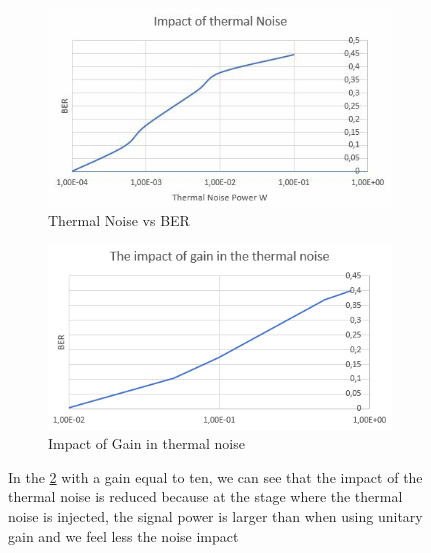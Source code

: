 \begin{figure}[H]
    \centering
	\begin{subfigure}{0.4\textwidth}
		\centering
    	\includegraphics[scale=0.45]{./lib/m_qam_receiver/figures/thermal_noise_ber.png}
    	\caption{Thermal Noise vs BER}
    	\label{fig:thermal}
	\end{subfigure}    
	\begin{subfigure}{0.4\textwidth}
    	\centering
    	\includegraphics[scale=0.45]{../lib/m_qam_receiver/figures/ber_thermal_gain.png}
    	\caption{Impact of Gain in thermal noise}
    	\label{fig:gainvsthermal}
	\end{subfigure}
\caption{In the \ref{fig:gainvsthermal} with a gain equal to ten, we can see that the impact of the thermal noise is reduced because at the stage where the thermal noise is injected, the signal power is larger than when using unitary gain and we feel less the noise impact}
\label{fig:thermal_compare}
\end{figure}
\pagebreak

